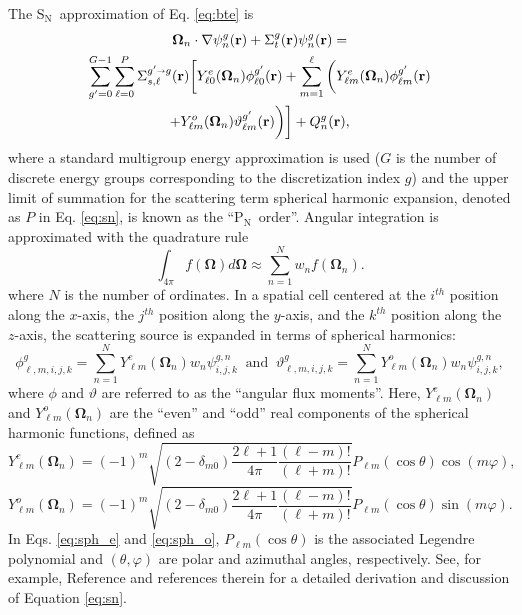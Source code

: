 \documentclass{article} %
\newcommand{\sa}{\shortrightarrow}
\newcommand{\bo}{\mathbf\Omega}
\newcommand{\vecr}{\textbf{r}}
\newcommand{\sn}{S$_\mathrm{N}$}
\newcommand{\pn}{P$_\mathrm{N}$}
\newcommand{\Ye}[2]{\ensuremath{Y^e_{#1}(\bo_#2)}}
\newcommand{\Yo}[2]{\ensuremath{Y^o_{#1}(\bo_#2)}}
\begin{document}
The \sn\ approximation of Eq. \eqref{eq:bte} is
%
\begin{multline}
\bo_n \cdot \nabla \psi_n^g(\vecr) + \Sigma_t^g(\vecr)\psi_n^g(\vecr) = \\
\sum_{g'=0}^{G-1}\sum_{\ell=0}^{P}\Sigma_{s,\ell}^{g'\sa g}(\vecr)
\bigg[\Ye{\ell 0}{n}\phi_{\ell 0}^{g'}(\vecr) + \sum_{m=1}^{\ell}
\bigg(\Ye{\ell m}{n}\phi_{\ell m}^{g'}(\vecr) \\
 + \Yo{\ell m}{n}\vartheta_{\ell m}^{g'}(\vecr)\bigg)\bigg]
+ Q_n^g(\vecr),
\label{eq:sn}
\end{multline}
%
where a standard multigroup energy approximation is used ($G$ is the
number of discrete energy groups corresponding to the discretization index
$g$) and the  upper limit of summation for the scattering term spherical
harmonic expansion, denoted as $P$ in Eq. \eqref{eq:sn}, is known as the
``\pn\ order''. Angular integration is approximated with the quadrature rule 
%
\begin{equation}
\int_{4\pi} f\left(\bo\right) d\bo \approx \sum_{n=1}^{N}w_n f\left(\bo_n\right).
\label{eq:quadrule}
\end{equation}
%
where $N$ is the number of ordinates. In a spatial cell centered at the
$i^{th}$ position along the $x$-axis, the $j^{th}$ position along the
$y$-axis, and the $k^{th}$ position along the $z$-axis, the scattering
source is expanded in terms of spherical harmonics:
%
\begin{equation}
\phi_{\ell,m,i,j,k}^{g}=\sum_{n=1}^N \Ye{\ell m}{n}w_n\psi^{g,n}_{i,j,k}\ \text{ and }\
\vartheta_{\ell,m,i,j,k}^{g} = \sum_{n=1}^N \Yo{\ell m}{n}w_n\psi^{g,n}_{i,j,k},
\label{sph_harm_exp}
\end{equation}
%
where $\phi$ and $\vartheta$ are referred to as the ``angular flux
moments''. Here, $\Ye{\ell m}{n}$ and $\Yo{\ell m}{n}$ are the ``even'' and
``odd'' real components of the spherical harmonic functions, defined as
\cite{exmm}
%
\begin{equation}
\Ye{\ell m}{n} = (-1)^m\sqrt{(2-\delta_{m0})\frac{2\ell+1}{4\pi}
                       \frac{(\ell-m)!}{(\ell+m)!}}
                       P_{\ell m}(\cos\theta)\cos(m\varphi),
\label{eq:sph_e}
\end{equation}
\begin{equation}
\Yo{\ell m}{n} = (-1)^m\sqrt{(2-\delta_{m0})\frac{2\ell+1}{4\pi}
                       \frac{(\ell-m)!}{(\ell+m)!}}
                       P_{\ell m}(\cos\theta)\sin(m\varphi).
\label{eq:sph_o}
\end{equation}
%
In Eqs. \eqref{eq:sph_e} and \eqref{eq:sph_o},
$P_{\ell m}(\cos\theta)$ is the associated Legendre polynomial and
$(\theta,\varphi)$ are polar and azimuthal angles, respectively. 
See, for example, Reference \cite{denovo} and references therein for a
detailed derivation  and discussion of Equation \eqref{eq:sn}.
\end{document}
